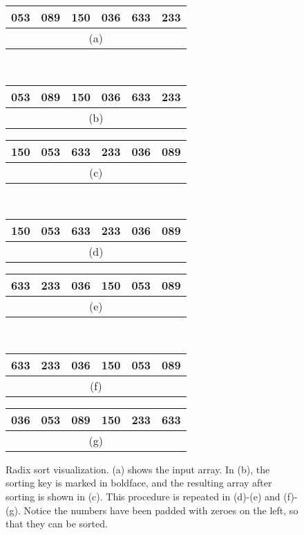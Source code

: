 \begin{figure}[!ht]
    \centering
    \begin{tabular}{|c|c|c|c|c|c|}
    \hline
    053 & 089 & 150 & 036 & 633 & 233 \\
    \hline
    \multicolumn{6}{c}{(a)} \\
    \end{tabular}
    \,
    \begin{tabular}{|c|c|c|c|c|c|}
    \hline
    05\textbf{3} & 08\textbf{9} & 15\textbf{0} & 03\textbf{6} & 63\textbf{3} & 23\textbf{3} \\
    \hline
    \multicolumn{6}{c}{(b)} \\
    \end{tabular}
    \break
    \begin{tabular}{|c|c|c|c|c|c|}
    \hline
    15\textbf{0} & 05\textbf{3} & 63\textbf{3} & 23\textbf{3} & 03\textbf{6} & 08\textbf{9} \\
    \hline
    \multicolumn{6}{c}{(c)} \\
    \end{tabular}
    \,
    \begin{tabular}{|c|c|c|c|c|c|}
    \hline
    1\textbf{5}0 & 0\textbf{5}3 & 6\textbf{3}3 & 2\textbf{3}3 & 0\textbf{3}6 & 0\textbf{8}9 \\
    \hline
    \multicolumn{6}{c}{(d)} \\
    \end{tabular}
    \break
    \begin{tabular}{|c|c|c|c|c|c|}
    \hline
    6\textbf{3}3 & 2\textbf{3}3 & 0\textbf{3}6 & 1\textbf{5}0 & 0\textbf{5}3 & 0\textbf{8}9 \\
    \hline
    \multicolumn{6}{c}{(e)} \\
    \end{tabular}
    \,
    \begin{tabular}{|c|c|c|c|c|c|}
    \hline
    \textbf{6}33 & \textbf{2}33 & \textbf{0}36 & \textbf{1}50 & \textbf{0}53 & \textbf{0}89 \\
    \hline
    \multicolumn{6}{c}{(f)} \\
    \end{tabular}
    \break
    \begin{tabular}{|c|c|c|c|c|c|}
    \hline
    \textbf{0}36 & \textbf{0}53 & \textbf{0}89 & \textbf{1}50 & \textbf{2}33 & \textbf{6}33  \\
    \hline
    \multicolumn{6}{c}{(g)} \\
    \end{tabular}
    
    \caption{Radix sort visualization. (a) shows the input array. In (b), the sorting key is marked in boldface, and the resulting array after sorting is shown in (c). This procedure is repeated in (d)-(e) and (f)-(g). Notice the numbers have been padded with zeroes on the left, so that they can be sorted.}
    \label{fig:radixsort_ex}
\end{figure}


